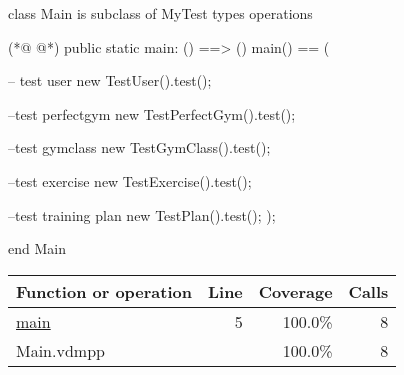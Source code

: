 \begin{vdmpp}[breaklines=true]
class Main is subclass of MyTest
types
operations

(*@
\label{main:5}
@*)
 public static main: () ==> ()
 main() == (
   
    -- test user
   new TestUser().test();
   
   --test perfectgym
   new TestPerfectGym().test();
   
   --test gymclass
   new TestGymClass().test();
   
   --test exercise
   new TestExercise().test();
   
   --test training plan
   new TestPlan().test();
 );

 
end Main
\end{vdmpp}
\bigskip
\begin{longtable}{|l|r|r|r|}
\hline
Function or operation & Line & Coverage & Calls \\
\hline
\hline
\hyperref[main:5]{main} & 5&100.0\% & 8 \\
\hline
\hline
Main.vdmpp & & 100.0\% & 8 \\
\hline
\end{longtable}

